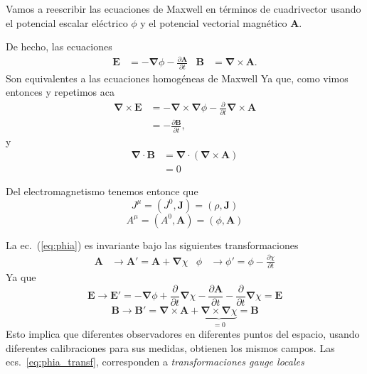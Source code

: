 Vamos a  reescribir las ecuaciones de Maxwell en términos de cuadrivector usando el potencial escalar eléctrico $\phi$ y el potencial vectorial magn\'etico $\mathbf{A}$.

De hecho, las ecuaciones
\begin{align}
  \label{eq:phia}
  \mathbf{E}&=-\boldsymbol{\nabla}\phi-\frac{\partial\mathbf{A}}{\partial t}&
  \mathbf{B}&=\boldsymbol{\nabla}\times\mathbf{A}.
\end{align}
 Son equivalentes a las ecuaciones homog\'eneas de Maxwell Ya que, como vimos entonces y repetimos aca
\begin{align*}
  \boldsymbol{\nabla}\times\mathbf{E}&=-\boldsymbol{\nabla}\times\boldsymbol{\nabla}\phi-\frac{\partial}{\partial t}\boldsymbol{\nabla}\times\mathbf{A}\\
  &=-\frac{\partial\mathbf{B}}{\partial t},
\end{align*}
y
\begin{align*}
  \boldsymbol{\nabla}\cdot\mathbf{B}&=\boldsymbol{\nabla}\cdot(\boldsymbol{\nabla}\times\mathbf{A})\\
  &=0
\end{align*}


\begin{frame}
Del electromagnetismo tenemos entonce que
\begin{equation}
  \label{eq:cv_jmu}
  J^\mu=(J^0,\mathbf{J})=(\rho,\mathbf{J})
\end{equation}
\begin{equation}
  \label{eq:cv_phia}
  A^\mu=(A^0,\mathbf{A})=(\phi,\mathbf{A})
\end{equation}
\end{frame}

La ec.~(\ref{eq:phia}) es invariante bajo las siguientes transformaciones
\begin{align}
  \label{eq:phia_transf}
  \mathbf{A}&\to\mathbf{A}'=\mathbf{A}+\boldsymbol{\nabla}\chi&
  \phi&\to\phi'=\phi-\frac{\partial\chi}{\partial t} 
\end{align}
Ya que
\begin{equation}
  \label{eq:Etrans}
  \mathbf{E}\to\mathbf{E}'= -\boldsymbol{\nabla}\phi+\frac{\partial}{\partial t}\boldsymbol{\nabla}\chi
  -\frac{\partial\mathbf{A}}{\partial t}-\frac{\partial}{\partial t}\boldsymbol{\nabla}\chi=\mathbf{E}
\end{equation}
\begin{equation}
  \label{eq:btransf}
  \mathbf{B}\to\mathbf{B}'= \boldsymbol{\nabla}\times\mathbf{A}+
  \underbrace{\boldsymbol{\nabla}\times\boldsymbol{\nabla}\chi}_{\displaystyle =0}=\mathbf{B}
\end{equation}
Esto implica que diferentes observadores en diferentes puntos del espacio, usando diferentes calibraciones para sus medidas, obtienen los mismos campos. Las  ecs.~\eqref{eq:phia_transf}, corresponden a \emph{transformaciones gauge locales}

